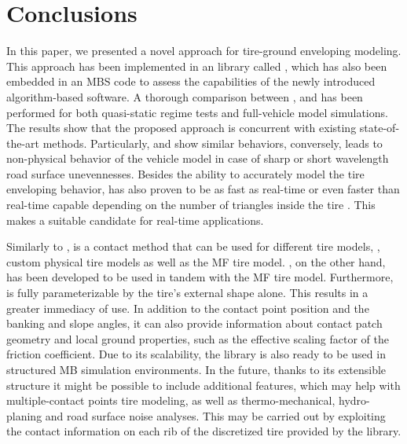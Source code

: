 
\section{Conclusions}
\label{chap3:Conclusions}

In this paper, we presented a novel approach for tire-ground enveloping modeling. This approach has been implemented in an \cpp{} library called \Enve{}, which has also been embedded in an \ac{MBS} code to assess the capabilities of the newly introduced algorithm-based software. A thorough comparison between \Enve{}, \Swift{} and \TMEasy{} has been performed for both quasi-static regime tests and full-vehicle model simulations. The results show that the proposed approach is concurrent with existing state-of-the-art methods. Particularly,  \Swift{} and \Enve{} show similar behaviors, conversely, \TMEasy{} leads to non-physical behavior of the vehicle model in case of sharp or short wavelength road surface unevennesses. Besides the ability to accurately model the tire enveloping behavior, \Enve{} has also proven to be as fast as real-time or even faster than real-time capable depending on the number of triangles inside the tire \Aabb{}. This makes \Enve{} a suitable candidate for real-time applications.

Similarly to \TMEasy{}, \Enve{} is a contact method that can be used for different tire models, \eg{}, custom physical tire models as well as the \ac{MF} tire model. \Swift{}, on the other hand, has been developed to be used in tandem with the \ac{MF} tire model. Furthermore, \Enve{} is fully parameterizable by the tire's external shape alone. This results in a greater immediacy of use. In addition to the contact point position and the banking and slope angles, it can also provide information about contact patch geometry and local ground properties, such as the effective scaling factor of the friction coefficient. Due to its scalability, the \Enve{} library is also ready to be used in structured MB simulation environments. In the future, thanks to its extensible structure it might be possible to include additional features, which may help with multiple-contact points tire modeling, as well as thermo-mechanical, hydro-planing and road surface noise analyses. This may be carried out by exploiting the contact information on each rib of the discretized tire provided by the \Enve{} library.

